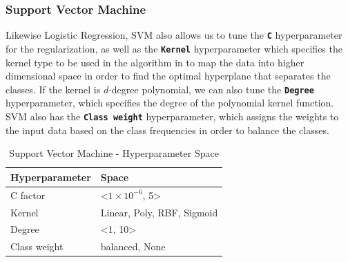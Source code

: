 \subsubsection{Support Vector Machine}
Likewise Logistic Regression, SVM also allows us to tune the \textbf{\texttt{C}} hyperparameter for the regularization, as well as the \textbf{\texttt{Kernel}} hyperparameter which specifies the kernel type to be used in the algorithm in to map the data into higher dimensional space in order to find the optimal hyperplane that separates the classes.
If the kernel is $d$-degree polynomial, we can also tune the \textbf{\texttt{Degree}} hyperparameter, which specifies the degree of the polynomial kernel function.
SVM also has the \textbf{\texttt{Class weight}} hyperparameter, which assigns the weights to the input data based on the class frequencies in order to balance the classes.



\begin{table}[H]
\small
\setlength{\tabcolsep}{8pt}
\renewcommand{\arraystretch}{1.3}
\centering
    \caption[Support Vector Machine - Hyperparameter Space]{Support Vector Machine - Hyperparameter Space}\label{tab:svmspace}
    \begin{tabular}{ll}
\toprule
\textbf{Hyperparameter} & \textbf{Space}\\
\midrule
\hline
C factor & <$1\times 10^{-6}$, 5> \\
Kernel & Linear, Poly, RBF, Sigmoid \\
Degree & <1, 10> \\
Class weight & balanced, None \\
\hline
\bottomrule
\end{tabular}
\vspace{0.7em}

\vspace{-1em}
\end{table}


